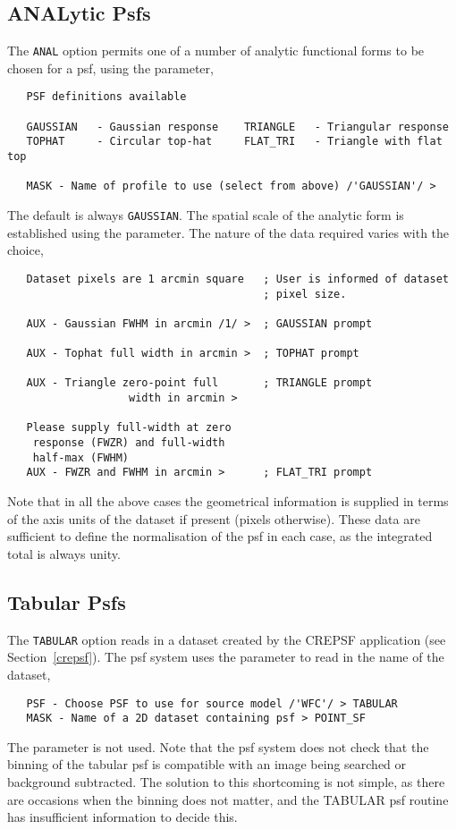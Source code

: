 \subsection{ANALytic Psfs}
The \verb+ANAL+ option permits one of a number of analytic functional forms
to be chosen for a psf, using the  parameter,
\begin{verbatim}
   PSF definitions available

   GAUSSIAN   - Gaussian response    TRIANGLE   - Triangular response
   TOPHAT     - Circular top-hat     FLAT_TRI   - Triangle with flat top

   MASK - Name of profile to use (select from above) /'GAUSSIAN'/ >
\end{verbatim}
The default is always \verb+GAUSSIAN+. The spatial scale of the analytic
form is established using the  parameter. The nature of the
data required varies with the  choice,
\begin{verbatim}
   Dataset pixels are 1 arcmin square   ; User is informed of dataset
                                        ; pixel size.

   AUX - Gaussian FWHM in arcmin /1/ >  ; GAUSSIAN prompt

   AUX - Tophat full width in arcmin >  ; TOPHAT prompt

   AUX - Triangle zero-point full       ; TRIANGLE prompt
                   width in arcmin > 

   Please supply full-width at zero 
    response (FWZR) and full-width 
    half-max (FWHM)
   AUX - FWZR and FWHM in arcmin >      ; FLAT_TRI prompt
\end{verbatim}
Note that in all the above cases the geometrical information is
supplied in terms of the axis units of the dataset if present
(pixels otherwise). These data are sufficient to define the
normalisation of the psf in each case, as the integrated total
is always unity.

\subsection{Tabular Psfs}
The \verb+TABULAR+ option reads in a dataset created by the CREPSF
application (see Section~\ref{crepsf}). The psf system uses the 
parameter to read in the name of the dataset,
\begin{verbatim}
   PSF - Choose PSF to use for source model /'WFC'/ > TABULAR
   MASK - Name of a 2D dataset containing psf > POINT_SF
\end{verbatim}
The  parameter is not used. Note that the psf system does not
check that the binning of the tabular psf is compatible with an image
being searched or background subtracted. The solution to this shortcoming 
is not simple, as there are occasions when the binning does not matter,
and the TABULAR psf routine has insufficient information to decide this.

